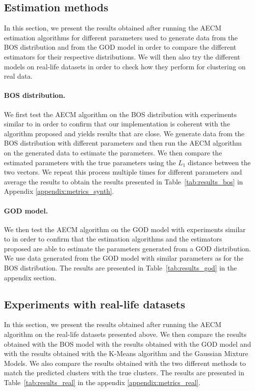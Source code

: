 \documentclass[a4paper,12pt]{article}
\begin{document}
\subsection{Estimation methods}
In this section, we present the results obtained after running the AECM estimation algorithms for different parameters used to generate data from the BOS distribution and from the GOD model in order to compare the different estimators for their respective distributions. We will then also try the different models on real-life datasets in order to check how they perform for clustering on real data.

\paragraph{BOS distribution.} We first test the AECM algorithm on the BOS distribution with experiments similar to \cite{biernacki2016model} in order to confirm that our implementation is coherent with the algorithm proposed and yields results that are close. We generate data from the BOS distribution with different parameters and then run the AECM algorithm on the generated data to estimate the parameters. We then compare the estimated parameters with the true parameters using the $L_1$ distance between the two vectors. We repeat this process multiple times for different parameters and average the results to obtain the results presented in Table~\ref{tab:results_bos} in Appendix \ref{appendix:metrics_synth}.

\paragraph{GOD model.} We then test the AECM algorithm on the GOD model with experiments similar to \cite{biernacki2016model} in order to confirm that the estimation algorithms and the estimators proposed are able to estimate the parameters generated from a GOD distribution. We use data generated from the GOD model with similar parameters as for the BOS distribution. 
The results are presented in Table~\ref{tab:results_god} in the appendix section.

\subsection{Experiments with real-life datasets}
In this section, we present the results obtained after running the AECM algorithm on the real-life datasets presented above. We then compare the results obtained with the BOS model with the results obtained with the GOD model and with the results obtained with the K-Means algorithm and the Gaussian Mixture Models. We also compare the results obtained with the two different methods to match the predicted clusters with the true clusters. The results are presented in Table~\ref{tab:results_real} in the appendix \ref{appendix:metrics_real}.
\end{document}
